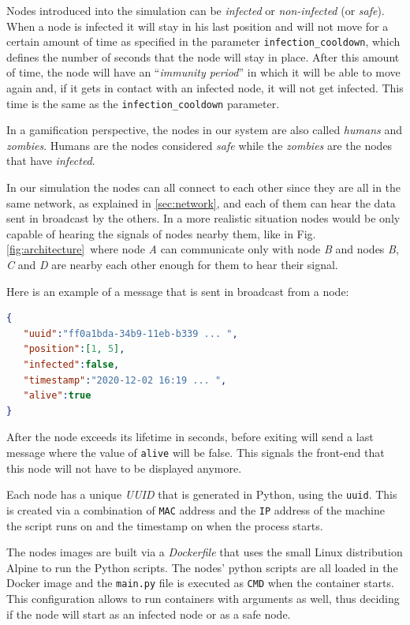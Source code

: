 \documentclass[conference]{IEEEtran}
\begin{document}
		Nodes introduced into the simulation can be \textit{infected} or \textit{non-infected} (or \textit{safe}).
		When a node is infected it will stay in his last position and will not move for a certain amount of time as specified in the parameter \texttt{infection\_cooldown}, which defines the number of seconds that the node will stay in place.
		After this amount of time, the node will have an ``\textit{immunity period}'' in which it will be able to move again and, if it gets in contact with an infected node, it will not get infected.
		This time is the same as the \texttt{infection\_cooldown} parameter.
		
		In a gamification perspective, the nodes in our system are also called \textit{humans} and \textit{zombies}. 
		Humans are the nodes considered \textit{safe} while the \textit{zombies} are the nodes that have \textit{infected}.
		
		In our simulation the nodes can all connect to each other since they are all in the same network, as explained in \ref{sec:network}, and each of them can hear the data sent in broadcast by the others.
		In a more realistic situation nodes would be only capable of hearing the signals of nodes nearby them, like in Fig.\ref{fig:architecture}~where node \textit{A} can communicate only with node \textit{B} and nodes \textit{B}, \textit{C} and \textit{D} are nearby each other enough for them to hear their signal.

		Here is an example of a message that is sent in broadcast from a node:
		\begin{lstlisting}[language=json]
{  
   "uuid":"ff0a1bda-34b9-11eb-b339 ... ",
   "position":[1, 5],
   "infected":false,
   "timestamp":"2020-12-02 16:19 ... ",
   "alive":true
}  
		\end{lstlisting}
		
		After the node exceeds its lifetime in seconds, before exiting will send a last message where the value of \texttt{alive} will be false.
		This signals the front-end that this node will not have to be displayed anymore.
		
		Each node has a unique \textit{UUID} that is generated in Python, using the \texttt{uuid}\cite{uuid}.
		This is created via a combination of \texttt{MAC} address and the \texttt{IP} address of the machine the script runs on and the timestamp on when the process starts.

		The nodes images are built via a \textit{Dockerfile} that uses the small Linux distribution Alpine to run the Python scripts.
		The nodes' python scripts are all loaded in the Docker image and the \texttt{main.py} file is executed as \texttt{CMD} when the container starts.
		This configuration allows to run containers with arguments as well, thus deciding if the node will start as an infected node or as a safe node.
	
\end{document}
